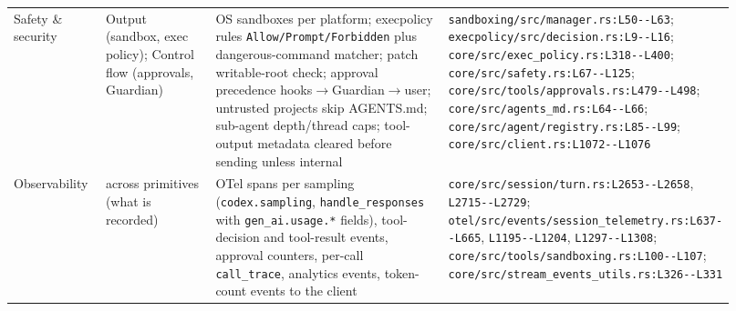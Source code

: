 \begin{longtable}{@{}p{0.13\linewidth}p{0.17\linewidth}p{0.36\linewidth}p{0.26\linewidth}@{}}
Safety \& security & Output (sandbox, exec policy); Control flow (approvals, Guardian) & OS sandboxes per platform; execpolicy rules \texttt{Allow/\allowbreak{}Prompt/\allowbreak{}Forbidden} plus dangerous-command matcher; patch writable-root check; approval precedence hooks$\rightarrow$Guardian$\rightarrow$user; untrusted projects skip AGENTS.md; sub-agent depth/thread caps; tool-output metadata cleared before sending unless internal & \texttt{sandboxing/\allowbreak{}src/\allowbreak{}manager.\allowbreak{}rs:\allowbreak{}L50-\allowbreak{}-\allowbreak{}L63}; \texttt{execpolicy/\allowbreak{}src/\allowbreak{}decision.\allowbreak{}rs:\allowbreak{}L9-\allowbreak{}-\allowbreak{}L16}; \texttt{core/\allowbreak{}src/\allowbreak{}exec\_\allowbreak{}policy.\allowbreak{}rs:\allowbreak{}L318-\allowbreak{}-\allowbreak{}L400}; \texttt{core/\allowbreak{}src/\allowbreak{}safety.\allowbreak{}rs:\allowbreak{}L67-\allowbreak{}-\allowbreak{}L125}; \texttt{core/\allowbreak{}src/\allowbreak{}tools/\allowbreak{}approvals.\allowbreak{}rs:\allowbreak{}L479-\allowbreak{}-\allowbreak{}L498}; \texttt{core/\allowbreak{}src/\allowbreak{}agents\_\allowbreak{}md.\allowbreak{}rs:\allowbreak{}L64-\allowbreak{}-\allowbreak{}L66}; \texttt{core/\allowbreak{}src/\allowbreak{}agent/\allowbreak{}registry.\allowbreak{}rs:\allowbreak{}L85-\allowbreak{}-\allowbreak{}L99}; \texttt{core/\allowbreak{}src/\allowbreak{}client.\allowbreak{}rs:\allowbreak{}L1072-\allowbreak{}-\allowbreak{}L1076} \\
Observability & across primitives (what is recorded) & OTel spans per sampling (\texttt{codex.\allowbreak{}sampling}, \texttt{handle\_\allowbreak{}responses} with \texttt{gen\_\allowbreak{}ai.\allowbreak{}usage.\allowbreak{}*} fields), tool-decision and tool-result events, approval counters, per-call \texttt{call\_\allowbreak{}trace}, analytics events, token-count events to the client & \texttt{core/\allowbreak{}src/\allowbreak{}session/\allowbreak{}turn.\allowbreak{}rs:\allowbreak{}L2653-\allowbreak{}-\allowbreak{}L2658}, \texttt{L2715-\allowbreak{}-\allowbreak{}L2729}; \texttt{otel/\allowbreak{}src/\allowbreak{}events/\allowbreak{}session\_\allowbreak{}telemetry.\allowbreak{}rs:\allowbreak{}L637-\allowbreak{}-\allowbreak{}L665}, \texttt{L1195-\allowbreak{}-\allowbreak{}L1204}, \texttt{L1297-\allowbreak{}-\allowbreak{}L1308}; \texttt{core/\allowbreak{}src/\allowbreak{}tools/\allowbreak{}sandboxing.\allowbreak{}rs:\allowbreak{}L100-\allowbreak{}-\allowbreak{}L107}; \texttt{core/\allowbreak{}src/\allowbreak{}stream\_\allowbreak{}events\_\allowbreak{}utils.\allowbreak{}rs:\allowbreak{}L326-\allowbreak{}-\allowbreak{}L331} \\

\end{longtable}
